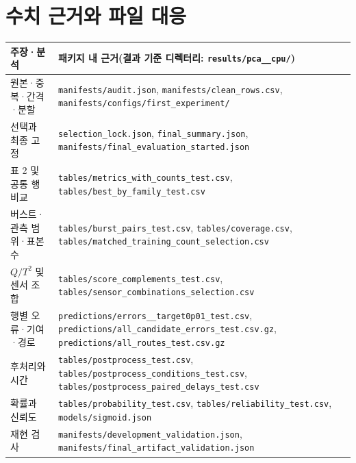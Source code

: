 \documentclass{article}
\newcommand{\code}[1]{\texttt{\small #1}}
\begin{document}
\section{수치 근거와 파일 대응}
\begin{table}[h]\centering\small
\begin{tabularx}{\textwidth}{lX}\toprule
주장·분석 & 패키지 내 근거(결과 기준 디렉터리: \code{results/\allowbreak pca\_\allowbreak 20261003\_\allowbreak cpu/\allowbreak })\\\midrule
원본·중복·간격·분할 & \code{manifests/\allowbreak audit.json}, \code{manifests/\allowbreak clean\_\allowbreak rows.csv}, \code{manifests/\allowbreak configs/\allowbreak first\_\allowbreak experiment/\allowbreak }\\
선택과 최종 고정 & \code{selection\_\allowbreak lock.json}, \code{final\_\allowbreak summary.json}, \code{manifests/\allowbreak final\_\allowbreak evaluation\_\allowbreak started.json}\\
표 2 및 공통 행 비교 & \code{tables/\allowbreak metrics\_\allowbreak with\_\allowbreak counts\_\allowbreak test.csv}, \code{tables/\allowbreak best\_\allowbreak by\_\allowbreak family\_\allowbreak test.csv}\\
버스트·관측 범위·표본 수 & \code{tables/\allowbreak burst\_\allowbreak pairs\_\allowbreak test.csv}, \code{tables/\allowbreak coverage.csv}, \code{tables/\allowbreak matched\_\allowbreak training\_\allowbreak count\_\allowbreak selection.csv}\\
$Q/T^2$ 및 센서 조합 & \code{tables/\allowbreak score\_\allowbreak complements\_\allowbreak test.csv}, \code{tables/\allowbreak sensor\_\allowbreak combinations\_\allowbreak selection.csv}\\
행별 오류·기여·경로 & \code{predictions/\allowbreak errors\_\allowbreak *\_\allowbreak target0p01\_\allowbreak test.csv}, \code{predictions/\allowbreak all\_\allowbreak candidate\_\allowbreak errors\_\allowbreak test.csv.gz}, \code{predictions/\allowbreak all\_\allowbreak routes\_\allowbreak test.csv.gz}\\
후처리와 시간 & \code{tables/\allowbreak postprocess\_\allowbreak test.csv}, \code{tables/\allowbreak postprocess\_\allowbreak conditions\_\allowbreak test.csv}, \code{tables/\allowbreak postprocess\_\allowbreak paired\_\allowbreak delays\_\allowbreak test.csv}\\
확률과 신뢰도 & \code{tables/\allowbreak probability\_\allowbreak test.csv}, \code{tables/\allowbreak reliability\_\allowbreak test.csv}, \code{models/\allowbreak sigmoid.json}\\
재현 검사 & \code{manifests/\allowbreak development\_\allowbreak validation.json}, \code{manifests/\allowbreak final\_\allowbreak artifact\_\allowbreak validation.json}\\\bottomrule
\end{tabularx}
\end{table}
\end{document}
